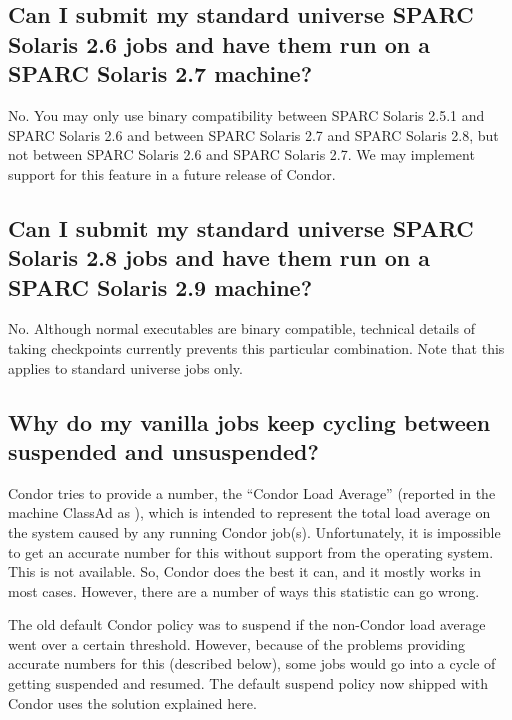 \subsection*{Can I submit my standard universe SPARC Solaris 2.6 jobs and have them run on a SPARC Solaris 2.7 machine?}

No. You may only use binary compatibility between SPARC Solaris 2.5.1
and SPARC Solaris 2.6 and between SPARC Solaris 2.7 and SPARC Solaris
2.8, but not between SPARC Solaris 2.6 and SPARC Solaris 2.7.  We may
implement support for this feature in a future release of Condor.

\subsection*{Can I submit my standard universe SPARC Solaris 2.8 jobs and have them run on a SPARC Solaris 2.9 machine?}

No.  Although normal executables are binary compatible, technical details
of taking checkpoints currently prevents this particular combination.
Note that this applies to standard universe jobs only.


\subsection*{Why do my vanilla jobs keep cycling between suspended and unsuspended?}

Condor tries to provide a number, the ``Condor Load Average''
(reported in the machine ClassAd as ), which is
intended to represent the total load average on the system caused by
any running Condor job(s).
Unfortunately, it is impossible to get an accurate number for
this without support from the operating system.
This is not available.
So, Condor does the best it can, and it mostly works in most cases.
However, there are a number of ways this statistic can go wrong.

The old default Condor policy was to suspend if the non-Condor load
average went over a certain threshold.
However, because of the problems providing accurate numbers for this
(described below), some jobs would go into a cycle of getting
suspended and resumed.
The default suspend policy now shipped with Condor uses the
solution explained here.

